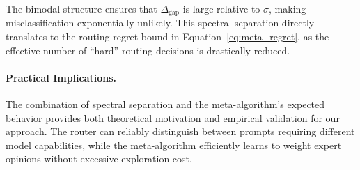 The bimodal structure ensures that $\Delta_{\text{gap}}$ is large relative to $\sigma$, making misclassification exponentially unlikely. This spectral separation directly translates to the routing regret bound in Equation~\eqref{eq:meta_regret}, as the effective number of ``hard'' routing decisions is drastically reduced.

\paragraph{Practical Implications.}
The combination of spectral separation and the meta-algorithm's expected behavior provides both theoretical motivation and empirical validation for our approach. The router can reliably distinguish between prompts requiring different model capabilities, while the meta-algorithm efficiently learns to weight expert opinions without excessive exploration cost.

